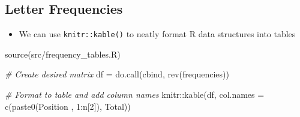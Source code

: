 \documentclass[
]{article}
\newenvironment{Shaded}{\begin{snugshade}}{\end{snugshade}}
\newcommand{\AttributeTok}[1]{\textcolor[rgb]{0.77,0.63,0.00}{#1}}
\newcommand{\CommentTok}[1]{\textcolor[rgb]{0.56,0.35,0.01}{\textit{#1}}}
\newcommand{\DecValTok}[1]{\textcolor[rgb]{0.00,0.00,0.81}{#1}}
\newcommand{\FunctionTok}[1]{\textcolor[rgb]{0.00,0.00,0.00}{#1}}
\newcommand{\NormalTok}[1]{#1}
\newcommand{\OtherTok}[1]{\textcolor[rgb]{0.56,0.35,0.01}{#1}}
\newcommand{\SpecialCharTok}[1]{\textcolor[rgb]{0.00,0.00,0.00}{#1}}
\newcommand{\StringTok}[1]{\textcolor[rgb]{0.31,0.60,0.02}{#1}}
\providecommand{\tightlist}{%
  \setlength{\itemsep}{0pt}\setlength{\parskip}{0pt}}
\begin{document}
\hypertarget{letter-frequencies}{%
\subsection{Letter Frequencies}\label{letter-frequencies}}

\begin{itemize}
\tightlist
\item
  We can use \texttt{knitr::kable()} to neatly format R data structures
  into tables
\end{itemize}

\begin{Shaded}
\begin{Highlighting}[]
\FunctionTok{source}\NormalTok{(}\StringTok{\textquotesingle{}src/frequency\_tables.R\textquotesingle{}}\NormalTok{)}

\CommentTok{\# Create desired matrix}
\NormalTok{df }\OtherTok{=} \FunctionTok{do.call}\NormalTok{(cbind, }\FunctionTok{rev}\NormalTok{(frequencies))}

\CommentTok{\# Format to table and add column names}
\NormalTok{knitr}\SpecialCharTok{::}\FunctionTok{kable}\NormalTok{(df, }\AttributeTok{col.names =} \FunctionTok{c}\NormalTok{(}\FunctionTok{paste0}\NormalTok{(}\StringTok{\textquotesingle{}Position \textquotesingle{}}\NormalTok{, }\DecValTok{1}\SpecialCharTok{:}\NormalTok{n[}\DecValTok{2}\NormalTok{]), }\StringTok{\textquotesingle{}Total\textquotesingle{}}\NormalTok{))}
\end{Highlighting}
\end{Shaded}
\end{document}
